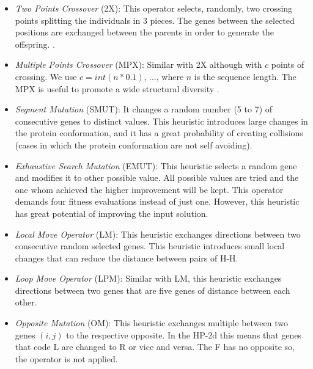 \documentclass[conference]{IEEEtran}
\begin{document}
  \begin{itemize}
  	\item \textit{Two Points Crossover} (2X): This operator selects, randomly, two crossing points splitting the individuals in 3 pieces. The genes between the selected positions are exchanged between the parents in order to generate the offspring. \cite{benitez2015algoritmo}.
  	
  	
  	\item  \textit{Multiple Points Crossover} (MPX): Similar with 2X although with $c$ points of crossing. We use $c=int(n*0.1)$, ..., where $n$ is the sequence length. The MPX is useful to promote a wide structural diversity \cite{sabar2015automatic}.
  	
	\item \textit{Segment Mutation} (SMUT): It changes a random number (5 to 7) of consecutive genes to distinct values. This heuristic introduces large changes in the protein conformation, and it has a great probability of creating collisions (cases in which the protein conformation are not self avoiding).  

	\item \textit {Exhaustive Search Mutation} (EMUT): 	This heuristic selects a random gene and modifies it to other possible value. All possible values are tried and the one whom achieved the higher improvement will be kept. This operator demands four fitness evaluations instead of just one. However, this heuristic has great potential of improving the input solution.
	
	\item \textit{Local Move Operator} (LM): This heuristic exchanges directions between two consecutive random selected genes. This heuristic introduces small local changes that can reduce the distance between pairs of H-H.
	
	\item \textit{Loop Move Operator} (LPM): Similar with LM, this heuristic exchanges directions between two genes that are five genes of distance between each other.
	
	
	\item \textit{Opposite Mutation} (OM): This heuristic exchanges multiple between two genes $(i,j)$ 	 to the respective opposite. In the HP-2d this means that genes that code L are changed to R or vice and versa. The F has no opposite so, the operator is not applied. 

 \end{itemize} 	 
 
\end{document}

